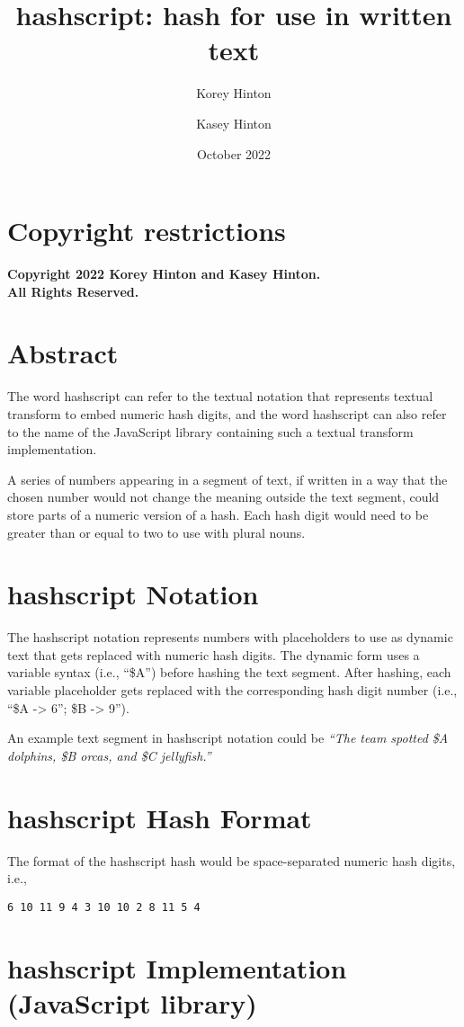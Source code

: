 \documentclass[letterpaper]{article}
\begin{document}
\title{\textbf{hashscript}: hash for use in written text}
\author{
Korey Hinton
\and
Kasey Hinton
}
\date{October 2022}

\maketitle

\newpage

\section*{Copyright restrictions}
\textbf{Copyright 2022 Korey Hinton and Kasey Hinton. \\ All Rights Reserved.}

\newpage

\tableofcontents

\newpage

\section{Abstract}
%
The word hashscript can refer to the textual notation
that represents textual transform to embed numeric hash digits,
and the word hashscript can also refer to the name
of the JavaScript library containing such a
textual transform implementation.

A series of numbers appearing in a segment of text,
if written in a way that the chosen number would not
change the meaning outside the text segment,
could store parts of a numeric version of a hash.
Each hash digit would need to be greater than or equal to two to use
with plural nouns.

\section{hashscript Notation}

The hashscript
notation represents numbers with placeholders
to use as dynamic text that gets replaced
with numeric hash digits. The dynamic form
uses a variable syntax (i.e., ``\$A'') before hashing
the text segment. After hashing, each variable
placeholder gets replaced with the corresponding hash
digit number (i.e., ``\$A -> 6''; \$B -> 9'').

An example text segment in hashscript notation
could be \textit{``The team spotted \$A dolphins, \$B orcas,
and \$C jellyfish.''}

\section{hashscript Hash Format}

The format of the hashscript hash would be space-separated
numeric hash digits, i.e., \begin{verbatim}6 10 11 9 4 3 10 10 2 8 11 5 4\end{verbatim}

\section{hashscript Implementation (JavaScript library)}
\end{document}
